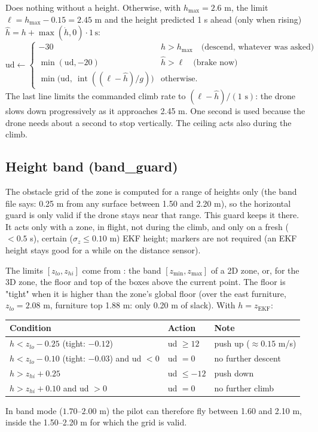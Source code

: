 Does nothing without a height. Otherwise, with $h_{\max}=2.6$ m, the limit $\ell = h_{\max}-0.15 = 2.45$ m and the
height predicted 1 s ahead (only when rising) $\hat h = h + \max(\dot h,0)\cdot1\,\text{s}$:
$$
\text{ud} \leftarrow
\begin{cases}
-30 & h > h_{\max} \quad\text{(descend, whatever was asked)}\\
\min(\text{ud}, -20) & \hat h > \ell \quad\text{(brake now)}\\
\min\big(\text{ud},\ \operatorname{int}((\ell-\hat h)/g)\big) & \text{otherwise.}
\end{cases}
$$
The last line limits the commanded climb rate to $(\ell-\hat h)/(1\text{ s})$: the drone slows down
progressively as it approaches 2.45 m. One second is used because the drone needs about a second to stop
vertically. The ceiling acts also during the climb.

\subsection{Height band (band\_guard)}

The obstacle grid of the zone is computed for a range of heights only (the band file says: 0.25 m from any
surface between 1.50 and 2.20 m), so the horizontal guard is only valid if the drone stays near that range. This
guard keeps it there. It acts only with a zone, in flight, not during the climb, and only on a fresh ($<0.5$ s),
certain ($\sigma_z\le0.10$ m) EKF height; markers are not required (an EKF height stays good for a while on the
distance sensor).

The limits $[z_{lo}, z_{hi}]$ come from : the band $[z_{\min}, z_{\max}]$ of a 2D
zone, or, for the 3D zone, the floor and top of the boxes above the current point. The floor is "tight" when it
is higher than the zone's global floor (over the east furniture, $z_{lo}=2.08$ m, furniture top 1.88 m: only 0.20 m
of slack). With $h=z_{\text{EKF}}$:

\begin{center}\small
\begin{tabular}{lll}
\toprule
\textbf{Condition} & \textbf{Action} & \textbf{Note} \\
\midrule
$h < z_{lo} - 0.25$ (tight: $-0.12$) & ud $\ge 12$ & push up ($\approx0.15$ m/s) \\
$h < z_{lo} - 0.10$ (tight: $-0.03$) and ud $<0$ & ud $=0$ & no further descent \\
$h > z_{hi} + 0.25$ & ud $\le -12$ & push down \\
$h > z_{hi} + 0.10$ and ud $>0$ & ud $=0$ & no further climb \\
\bottomrule
\end{tabular}
\end{center}
In band mode ($1.70$--$2.00$ m) the pilot can therefore fly between 1.60 and 2.10 m, inside the 1.50--2.20 m for
which the grid is valid.

